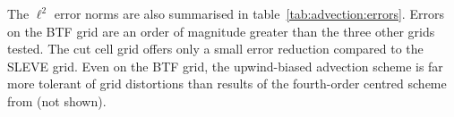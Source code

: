 The $\ell^2$ error norms are also summarised in table~\ref{tab:advection:errors}.  Errors on the BTF grid are an order of magnitude greater than the three other grids tested.  The cut cell grid offers only a small error reduction compared to the SLEVE grid.  Even on the BTF grid, the upwind-biased advection scheme is far more tolerant of grid distortions than results of the fourth-order centred scheme from \textcite{schaer2002} (not shown).


